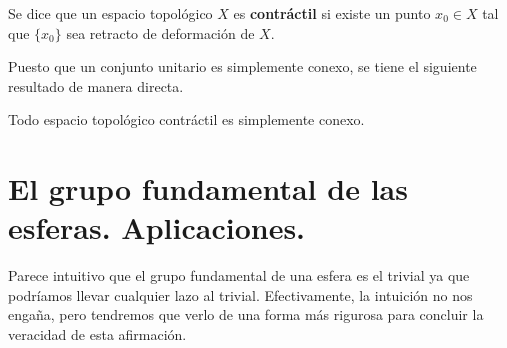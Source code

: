\begin{definicion}
    Se dice que un espacio topológico $X$ es \textbf{contráctil} si existe un punto $x_0\in X$ tal que $\{x_0\}$ sea retracto de deformación de $X$.
\end{definicion}

Puesto que un conjunto unitario es simplemente conexo, se tiene el siguiente resultado de manera directa.
\begin{coro}
    Todo espacio topológico contráctil es simplemente conexo.
\end{coro}

\section{El grupo fundamental de las esferas. Aplicaciones.}

Parece intuitivo que el grupo fundamental de una esfera es el trivial ya que podríamos llevar cualquier lazo al trivial. Efectivamente, la intuición no nos engaña, pero tendremos que verlo de una forma más rigurosa para concluir la veracidad de esta afirmación.

